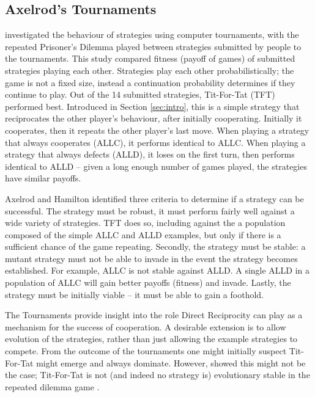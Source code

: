 \documentclass[a4paper,11pt,bcshonoursthesis,singlespace,oneside,thesisdraft,pdflatex]{cssethesis}
\begin{document}
\subsection{Axelrod's Tournaments}
\citet{axelrod:Science:1981} investigated the behaviour of strategies using computer tournaments, with the repeated Prisoner's Dilemma played between strategies submitted by people to the tournaments. 
This study compared fitness (payoff of games) of submitted strategies playing each other. 
Strategies play each other probabilistically; the game is not a fixed size, instead a continuation probability determines if they continue to play. Out of the 14 submitted strategies, Tit-For-Tat (TFT) performed best. 
Introduced in Section \ref{sec:intro}, this is a simple strategy that reciprocates the other player's behaviour, after initially cooperating. 
Initially it cooperates, then it repeats the other player's last move. 
When playing a strategy that always cooperates (ALLC), it performs identical to ALLC. 
When playing a strategy that always defects (ALLD), it loses on the first turn, then performs identical to ALLD -- given a long enough number of games played, the strategies have similar payoffs. 

Axelrod and Hamilton identified three criteria to determine if a strategy can be successful. The strategy must be robust, it must perform fairly well against a wide variety of strategies. TFT does so, including against the a population composed of the simple ALLC and ALLD examples, but only if there is a sufficient chance of the game repeating. Secondly, the strategy must be stable: a mutant strategy must not be able to invade in the event the strategy becomes established. For example, ALLC is not stable against ALLD. 
A single ALLD in a population of ALLC will gain better payoffs (fitness) and invade. 
Lastly, the strategy must be initially viable -- it must be able to gain a foothold. 

The Tournaments provide insight into the role Direct Reciprocity can play as a mechanism for the success of cooperation. 
A desirable extension is to allow evolution of the strategies, rather than just allowing the example strategies to compete. 
From the outcome of the tournaments one might initially suspect Tit-For-Tat might emerge and always dominate. However, \citet{boyd1987no} showed this might not be the case; Tit-For-Tat is not (and indeed no strategy is) evolutionary stable in the repeated dilemma game \citep{boyd1987no}. 
\end{document}
